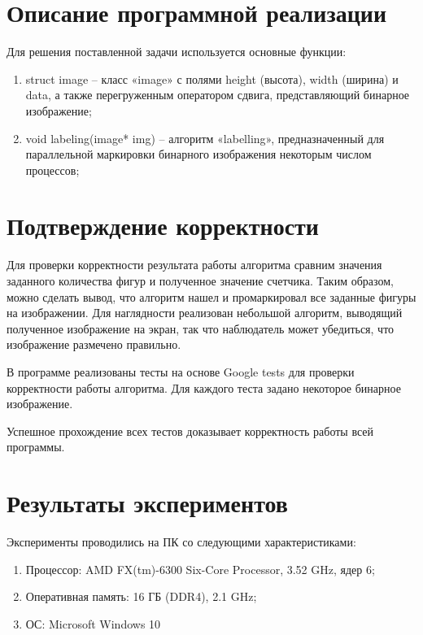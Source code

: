\documentclass{report}
\begin{document}
\section*{Описание программной реализации}
Для решения поставленной задачи используется основные функции:
\begin{enumerate}
\item struct image – класс  «image»  с полями  height (высота),  width (ширина) и  data,  а также перегруженным оператором сдвига, представляющий бинарное изображение;
\item void labeling(image* img) – алгоритм  «labelling»,  предназначенный  для параллельной маркировки бинарного изображения некоторым числом процессов;
\end{enumerate}
\newpage

\section*{Подтверждение корректности}
Для  проверки  корректности  результата  работы  алгоритма  сравним  значения заданного  количества  фигур  и  полученное  значение  счетчика.  Таким  образом,  можно сделать  вывод,  что  алгоритм  нашел  и  промаркировал  все  заданные  фигуры  на изображении. Для наглядности реализован небольшой алгоритм, выводящий полученное изображение на экран, так что наблюдатель может убедиться, что изображение размечено 
правильно. 
\par В программе реализованы тесты на основе Google tests для проверки корректности работы  алгоритма.  Для  каждого  теста  задано  некоторое  бинарное  изображение. 
\par Успешное прохождение всех тестов доказывает корректность работы всей программы.
\newpage

\section*{Результаты экспериментов}
Эксперименты проводились на ПК со следующими характеристиками:
\begin{enumerate}
\item Процессор: AMD FX(tm)-6300 Six-Core Processor, 3.52 GHz, ядер 6;
\item Оперативная память: 16 ГБ (DDR4), 2.1 GHz;
\item ОС: Microsoft Windows 10 
\end{enumerate}
\end{document}
